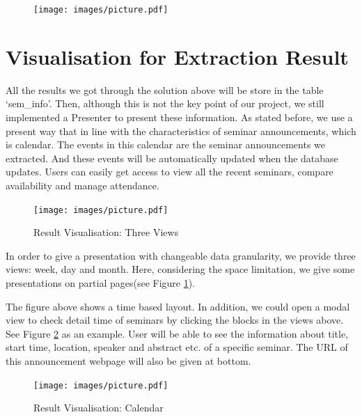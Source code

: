 \begin{figure}[htb!]
	\centering
	\texttt{[image: images/picture.pdf]}
\end{figure}

\section{Visualisation for Extraction Result}
All the results we got through the solution above will be store in the table `sem\_info'. Then, although this is not the key point of our project, we still implemented a Presenter to present these information. As stated before, we use a present way that in line with the characteristics of seminar announcements, which is calendar. The events in this calendar are the seminar announcements we extracted. And these events will be automatically updated when the database updates. Users can easily get access to view all the recent seminars, compare availability and manage attendance.
\begin{figure}[htbp!]
	\centering
	\texttt{[image: images/picture.pdf]}
	\caption{Result Visualisation: Three Views}\label{fig:calender_views}
\end{figure}

In order to give a presentation with changeable data granularity, we provide three views: week, day and month. Here, considering the space limitation, we give some presentations on partial pages(see Figure \ref{fig:calender_views}).

The figure above shows a time based layout. In addition, we could open a modal view to check detail time of seminars by clicking the blocks in the views above. See Figure \ref{fig:calendar_inst} as an example. User will be able to see the information about title, start time, location, speaker and abstract etc. of a specific seminar. The URL of this announcement webpage will also be given at bottom.

\begin{figure}[htb!]
	\centering
	\texttt{[image: images/picture.pdf]}
	\caption{Result Visualisation: Calendar}\label{fig:calendar_inst}
\end{figure}










